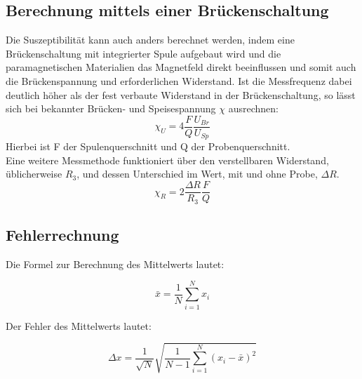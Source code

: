\subsection{Berechnung mittels einer Brückenschaltung}
Die Suszeptibilität kann auch anders berechnet werden, indem eine Brückenschaltung mit integrierter Spule aufgebaut wird und die paramagnetischen Materialien das Magnetfeld direkt beeinflussen und somit auch die Brückenspannung und erforderlichen Widerstand.
Ist die Messfrequenz dabei deutlich höher als der fest verbaute Widerstand in der Brückenschaltung, so lässt sich bei bekannter Brücken- und Speisespannung $\chi$ ausrechnen:
\begin{equation}
    \chi_U = 4\frac{F}{Q}\frac{U_{Br}}{U_{Sp}}
    \label{eq:chiu}
\end{equation}
Hierbei ist F der Spulenquerschnitt und Q der Probenquerschnitt.\\
Eine weitere Messmethode funktioniert über den verstellbaren Widerstand, üblicherweise $R_3$, und dessen Unterschied im Wert, mit und ohne Probe, $\Delta R$.
\begin{equation}
    \chi_R = 2\frac{\Delta R}{R_3}\frac{F}{Q}
    \label{eq:chir}
\end{equation} 
\subsection{Fehlerrechnung}
Die Formel zur Berechnung des Mittelwerts lautet:

\begin{equation}
    \bar{x} = \frac{1}{N} \sum_{i=1}^N x_i
\end{equation}

Der Fehler des Mittelwerts lautet:

\begin{equation}
    \Delta x = \frac{1}{\sqrt{N}}\sqrt{\frac{1}{N-1}\sum_{i=1}^N (x_i-\bar{x})^2}
    \label{eq:std}
\end{equation}